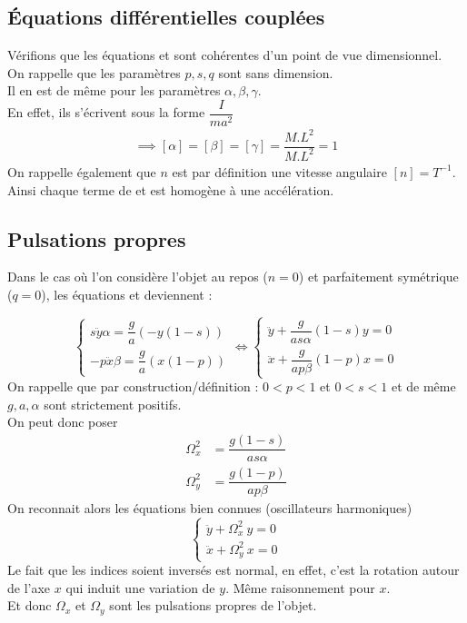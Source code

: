 \documentclass[12pt,a4paper]{article}
\makeatletter
\renewcommand*{\eqref}[1]{%
	\hyperref[{#1}]{\textup{\tagform@{\ref*{#1}}}}%
}
\makeatother
\begin{document}
	\subsection{Équations différentielles couplées}
	\label{subsec:dimension-equations}
	Vérifions que les équations \eqref{eq:equa-diff-couplées1} et \eqref{eq:equa-diff-couplées2} sont cohérentes d'un point de vue dimensionnel.\\
	On rappelle que les paramètres $p,s,q$ sont sans dimension.\\
	Il en est de même pour les paramètres $\alpha,\beta,\gamma$.\\
	En effet, ils s'écrivent sous la forme $\dfrac{I}{ma^2}$
	\begin{align*}
	\implies [\alpha]=[\beta]=[\gamma]=\dfrac{M.L^2}{M.L^2}=1
	\end{align*}
	On rappelle également que $n$ est par définition \eqref{subsec:omega} une vitesse angulaire $[n]=T^{-1}$.\\
	Ainsi chaque terme de \eqref{eq:equa-diff-couplées1} et \eqref{eq:equa-diff-couplées2} est homogène à une accélération.
	
	\subsection{Pulsations propres}
	\label{subsec:pulsations-propres}
	Dans le cas où l'on considère l'objet au repos ($n=0$) et parfaitement symétrique ($q=0$), les équations \eqref{eq:equa-diff-couplées1} et \eqref{eq:equa-diff-couplées2} deviennent :
	
	\[
	\begin{cases}
	s\ddot{y}\alpha=\dfrac{g}{a}(-y(1-s))\\[2ex]
	-p\ddot{x}\beta=\dfrac{g}{a}(x(1-p))
	\end{cases}
	\iff
	\begin{cases}
	\ddot{y}+\dfrac{g}{as\alpha}(1-s)y=0\\[2ex]
	\ddot{x}+\dfrac{g}{ap\beta}(1-p)x=0
	\end{cases}
	\]
	On rappelle que par construction/définition : $0<p<1$ et $0<s<1$ et de même $g,a,\alpha$ sont strictement positifs.\\
	
	On peut donc poser
	\begin{align*}
	\Omega_x^2&=\dfrac{g(1-s)}{as\alpha}\\[2ex]
	\Omega_y^2&=\dfrac{g(1-p)}{ap\beta}
	\end{align*}
	On reconnait alors les équations bien connues (oscillateurs harmoniques)
	\[
	\begin{cases}
	\ddot{y}+\Omega_x^2\ y=0\\[2ex]
	\ddot{x}+\Omega_y^2\ x=0
	\end{cases}
	\]
	Le fait que les indices soient inversés est normal, en effet, c'est la rotation autour de l'axe $x$ qui induit une variation de $y$. Même raisonnement pour $x$.\\
	Et donc $\Omega_x$ et $\Omega_y$ sont les pulsations propres de l'objet.
	
\end{document}

